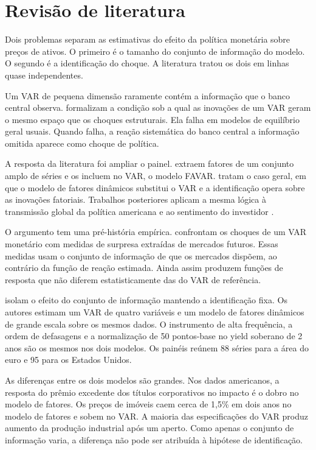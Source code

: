 \documentclass[
article,			%
12pt,				%
oneside,			%
a4paper,			%
hidelinks, 
english,			%
brazil,				%
]{abntex2}
\theoremstyle{plain}
\theoremstyle{definition}
\theoremstyle{remark}
\begin{document}
\section{Revisão de literatura}

Dois problemas separam as estimativas do efeito da política monetária sobre preços de ativos. O primeiro é o tamanho do conjunto de informação do modelo. O segundo é a identificação do choque. A literatura tratou os dois em linhas quase independentes.

Um VAR de pequena dimensão raramente contém a informação que o banco central observa.  formalizam a condição sob a qual as inovações de um VAR geram o mesmo espaço que os choques estruturais. Ela falha em modelos de equilíbrio geral usuais. Quando falha, a reação sistemática do banco central a informação omitida aparece como choque de política.

A resposta da literatura foi ampliar o painel.  extraem fatores de um conjunto amplo de séries e os incluem no VAR, o modelo FAVAR.  tratam o caso geral, em que o modelo de fatores dinâmicos substitui o VAR e a identificação opera sobre as inovações fatoriais. Trabalhos posteriores aplicam a mesma lógica à transmissão global da política americana \cite{miranda} e ao sentimento do investidor \cite{lutz}.

O argumento tem uma pré-história empírica.  confrontam os choques de um VAR monetário com medidas de surpresa extraídas de mercados futuros. Essas medidas usam o conjunto de informação de que os mercados dispõem, ao contrário da função de reação estimada. Ainda assim produzem funções de resposta que não diferem estatisticamente das do VAR de referência.

 isolam o efeito do conjunto de informação mantendo a identificação fixa. Os autores estimam um VAR de quatro variáveis e um modelo de fatores dinâmicos de grande escala sobre os mesmos dados. O instrumento de alta frequência, a ordem de defasagens e a normalização de 50 pontos-base no yield soberano de 2 anos são os mesmos nos dois modelos. Os painéis reúnem 88 séries para a área do euro e 95 para os Estados Unidos.

As diferenças entre os dois modelos são grandes. Nos dados americanos, a resposta do prêmio excedente dos títulos corporativos no impacto é o dobro no modelo de fatores. Os preços de imóveis caem cerca de 1,5\% em dois anos no modelo de fatores e sobem no VAR. A maioria das especificações do VAR produz aumento da produção industrial após um aperto. Como apenas o conjunto de informação varia, a diferença não pode ser atribuída à hipótese de identificação.
\end{document}

